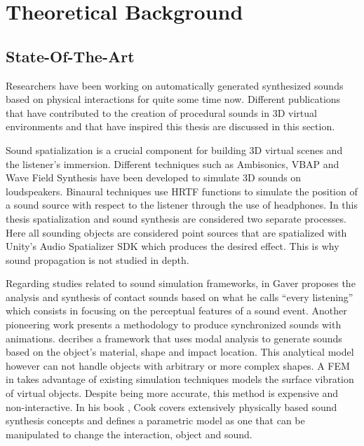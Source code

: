 \chapter{Theoretical Background}\label{ch:theory}

\section{State-Of-The-Art}\label{sec:state_art}





Researchers have been working on automatically generated synthesized sounds based on physical interactions for quite some time now. Different publications that have contributed to the creation of procedural sounds in 3D virtual environments and that have inspired this thesis are discussed in this section.

Sound spatialization is a crucial component for building 3D virtual scenes and the listener's immersion. Different techniques such as Ambisonics, VBAP and Wave Field Synthesis have been developed to simulate 3D sounds on loudspeakers. Binaural techniques use HRTF functions to simulate the position of a sound source with respect to the listener through the use of headphones. In this thesis spatialization and sound synthesis are considered two separate processes. Here all sounding objects are considered point sources that are spatialized with Unity's Audio Spatializer SDK \cite{bib:unity_doc} which produces the desired effect. This is why sound propagation is not studied in depth. 

Regarding studies related to sound simulation frameworks, in \cite{gaver1993we, gaver1993world} Gaver proposes the analysis and synthesis of contact sounds based on what he calls ``every listening'' which consists in focusing on the perceptual features of a sound event. Another pioneering work \cite{takala1992sound} presents a methodology to produce synchronized sounds with animations. \cite{van1998sounds} decribes a framework that uses modal analysis to generate sounds based on the object's material, shape and impact location. This analytical model however can not handle objects with arbitrary or more complex shapes. A \gls{FEM} in \cite{director2001synthesizing} takes advantage of existing simulation techniques models the surface vibration of virtual objects. Despite being more accurate, this method is expensive and non-interactive. In his book \cite{Cook:2002:RSS:515316}, Cook covers extensively physically based sound synthesis concepts and defines a parametric model as one that can be manipulated to change the interaction, object and sound.  

